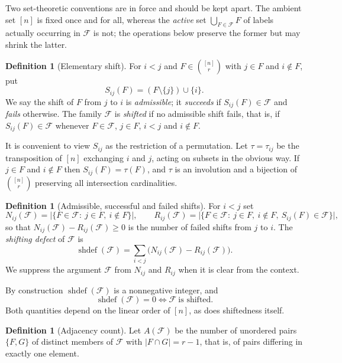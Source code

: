 \documentclass[11pt,reqno]{amsart}
\theoremstyle{plain}
\theoremstyle{definition}
\newtheorem{definition}[theorem]{Definition}
\DeclareMathOperator{\shdef}{shdef}
\newcommand{\F}{\mathcal{F}}
\newcommand{\Sij}{S_{ij}}
\begin{document}
Two set-theoretic conventions are in force and should be kept apart. The ambient set $[n]$ is fixed
once and for all, whereas the \emph{active} set $\bigcup_{F\in\F}F$ of labels actually occurring in
$\F$ is not; the operations below preserve the former but may shrink the latter.

\begin{definition}[Elementary shift]\label{def:shift}
For $i<j$ and $F\in\binom{[n]}{r}$ with $j\in F$ and $i\notin F$, put
\[
\Sij(F)=(F\setminus\{j\})\cup\{i\}.
\]
We say the shift of $F$ from $j$ to $i$ is \emph{admissible}; it \emph{succeeds} if
$\Sij(F)\in\F$ and \emph{fails} otherwise. The family $\F$ is \emph{shifted} if no admissible shift
fails, that is, if $\Sij(F)\in\F$ whenever $F\in\F$, $j\in F$, $i<j$ and $i\notin F$.
\end{definition}

It is convenient to view $\Sij$ as the restriction of a permutation. Let $\tau=\tau_{ij}$ be the
transposition of $[n]$ exchanging $i$ and $j$, acting on subsets in the obvious way. If $j\in F$ and
$i\notin F$ then $\Sij(F)=\tau(F)$, and $\tau$ is an involution and a bijection of $\binom{[n]}{r}$
preserving all intersection cardinalities.

\begin{definition}[Admissible, successful and failed shifts]\label{def:NR}
For $i<j$ set
\[
N_{ij}(\F)=\bigl|\{F\in\F:\ j\in F,\ i\notin F\}\bigr|,\qquad
R_{ij}(\F)=\bigl|\{F\in\F:\ j\in F,\ i\notin F,\ \Sij(F)\in\F\}\bigr|,
\]
so that $N_{ij}(\F)-R_{ij}(\F)\ge0$ is the number of failed shifts from $j$ to $i$. The
\emph{shifting defect} of $\F$ is
\[
\shdef(\F)=\sum_{i<j}\bigl(N_{ij}(\F)-R_{ij}(\F)\bigr).
\]
We suppress the argument $\F$ from $N_{ij}$ and $R_{ij}$ when it is clear from the context.
\end{definition}

By construction $\shdef(\F)$ is a nonnegative integer, and
\begin{equation}\label{eq:defzero}
\shdef(\F)=0\iff \F\ \text{is shifted}.
\end{equation}
Both quantities depend on the linear order of $[n]$, as does shiftedness itself.

\begin{definition}[Adjacency count]\label{def:A}
Let $A(\F)$ be the number of unordered pairs $\{F,G\}$ of distinct members of $\F$ with
$|F\cap G|=r-1$, that is, of pairs differing in exactly one element.
\end{definition}
\end{document}
